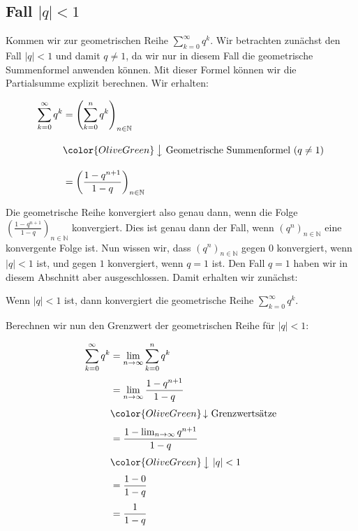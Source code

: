 \documentclass[fontsize=9pt,
               parskip=half-,
               DIV=14,
               listof=chapterentry,
               tocflat]{scrbook}
\begin{document}
\subsection{Fall $|q|<1$}

Kommen wir zur geometrischen Reihe $\sum _{k=0}^{\infty }q^{k}$. Wir betrachten zunächst den Fall $|q|<1$ und damit $q\neq 1$, da wir nur in diesem Fall die geometrische Summenformel anwenden können. Mit dieser Formel können wir die Partialsumme explizit berechnen. Wir erhalten:

\begin{align*}
\sum _{k=0}^{\infty }q^{k}&=\left(\sum _{k=0}^{n}q^{k}\right)_{n\in \mathbb {N} }\\[1em]&{\color {OliveGreen}\left\downarrow \ {\text{Geometrische Summenformel }}(q\neq 1)\right.}\\[1em]&=\left({\frac {1-q^{n+1}}{1-q}}\right)_{n\in \mathbb {N} }
\end{align*}

Die geometrische Reihe konvergiert also genau dann, wenn die Folge $\left({\tfrac {1-q^{n+1}}{1-q}}\right)_{n\in \mathbb {N} }$ konvergiert. Dies ist genau dann der Fall, wenn $\left(q^{n}\right)_{n\in \mathbb {N} }$ eine konvergente Folge ist. Nun wissen wir, dass $\left(q^{n}\right)_{n\in \mathbb {N} }$ gegen $0$ konvergiert, wenn $|q|<1$ ist, und gegen $1$ konvergiert, wenn $q=1$ ist. Den Fall $q=1$ haben wir in diesem Abschnitt aber ausgeschlossen. Damit erhalten wir zunächst:

\begin{importantparagraph*}
Wenn $|q|<1$ ist, dann konvergiert die geometrische Reihe $\sum _{k=0}^{\infty }q^{k}$.

\end{importantparagraph*}

Berechnen wir nun den Grenzwert der geometrischen Reihe für $|q|<1$:

\begin{align*}
\sum _{k=0}^{\infty }q^{k}&=\lim _{n\to \infty }\sum _{k=0}^{n}q^{k}\\[0.3em]&=\lim _{n\to \infty }{\frac {1-q^{n+1}}{1-q}}\\[0.3em]&{\color {OliveGreen}\left\downarrow \ {\text{Grenzwertsätze}}\right.}\\[0.3em]&={\frac {1-\lim _{n\to \infty }q^{n+1}}{1-q}}\\[0.3em]&{\color {OliveGreen}\left\downarrow \ |q|<1\right.}\\[0.3em]&={\frac {1-0}{1-q}}\\[0.3em]&={\frac {1}{1-q}}
\end{align*}
\end{document}
